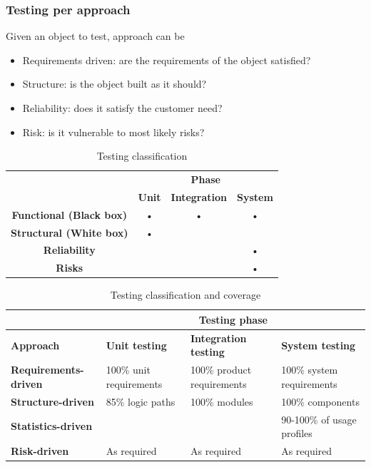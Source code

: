 \subsubsection{Testing per approach}
Given an object to test, approach can be
\begin{itemize}
\item Requirements driven: are the requirements of the object satisfied?
\item Structure: is the object built as it should?
\item Reliability: does it satisfy the customer need?
\item Risk: is it vulnerable to most likely risks?
\end{itemize}

\begin{table}
\centering
\begin{tabular}{|c|c|c|c|}
\hline 
\multirow{2}{*}{} & \multicolumn{3}{c|}{\textbf{Phase}} \\ 
\cline{2-4}
 & \textbf{Unit} & \textbf{Integration} & \textbf{System} \\ 
\hline 
\textbf{Functional (Black box)} & • & • & • \\ 
\hline 
\textbf{Structural (White box)} & • &  & \\ 
\hline 
\textbf{Reliability} & & & • \\ 
\hline 
\textbf{Risks} & & & • \\ 
\hline 
\end{tabular}
\caption{Testing classification}
\end{table}

\begin{table}
\centering
\begin{tabularx}{\textwidth}{|X|X|X|X|}
\hline 
 & \multicolumn{3}{c|}{\textbf{Testing phase}} \\ 
\hline
\textbf{Approach} & \textbf{Unit testing} & \textbf{Integration testing} & \textbf{System testing} \\ 
\hline 
\textbf{Requirements-driven} & 100\% unit requirements & 100\% product requirements & 100\% system requirements \\ 
\hline 
\textbf{Structure-driven} & 85\% logic paths & 100\% modules & 100\% components \\ 
\hline 
\textbf{Statistics-driven} & & & 90-100\% of usage profiles \\ 
\hline 
\textbf{Risk-driven} & As required & As required & As required \\ 
\hline 
\end{tabularx}
\caption{Testing classification and coverage}
\end{table}

